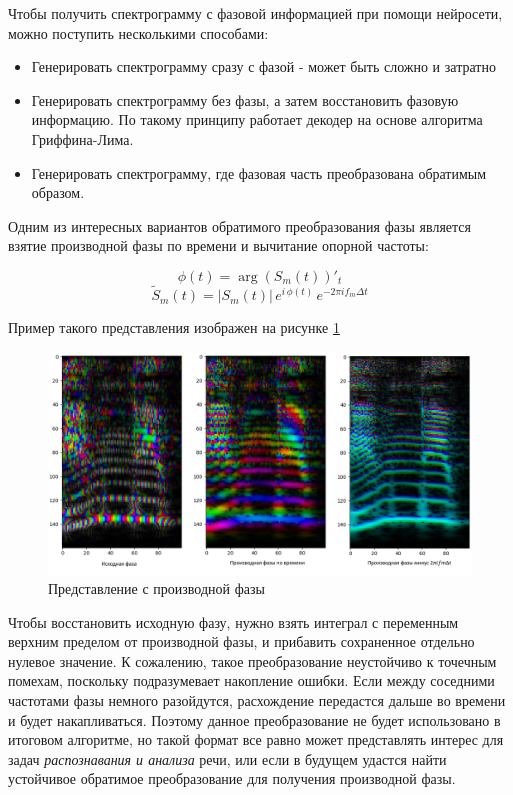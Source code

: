 Чтобы получить спектрограмму с фазовой информацией при помощи нейросети, можно поступить несколькими способами:
\begin{itemize}
  \item Генерировать спектрограмму сразу с фазой - может быть сложно и затратно
  \item Генерировать спектрограмму без фазы, а затем восстановить фазовую информацию. 
    По такому принципу работает декодер на основе алгоритма Гриффина-Лима.
  \item Генерировать спектрограмму, где фазовая часть преобразована обратимым образом.
\end{itemize}

Одним из интересных вариантов обратимого преобразования фазы является взятие производной фазы по времени и вычитание опорной частоты:

\begin{equation}
  \phi(t) = \arg(S_m(t))'_t
\end{equation}
\[ \tilde{S}_m(t) = |S_m(t)|\,e^{i\,\phi(t)}  \, e^{- 2\pi i f_m \Delta t} \]

Пример такого представления изображен на рисунке \ref{fig:freq_diff_repr}

\begin{figure}
  \centering
  \includegraphics[width=0.8\linewidth]{figures/freq_diff_repr}
  \caption{Представление с производной фазы}
  \label{fig:freq_diff_repr}
\end{figure}

Чтобы восстановить исходную фазу, нужно взять интеграл с переменным верхним пределом от производной фазы, 
и прибавить сохраненное отдельно нулевое значение. К сожалению, такое преобразование неустойчиво к точечным помехам, 
поскольку подразумевает накопление ошибки. Если между соседними частотами фазы немного разойдутся, 
расхождение передастся дальше во времени и будет накапливаться. Поэтому данное преобразование не будет использовано в итоговом алгоритме, 
но такой формат все равно может представлять интерес для задач \textit{распознавания и анализа} речи, или если в будущем удастся найти устойчивое 
обратимое преобразование для получения производной фазы.


